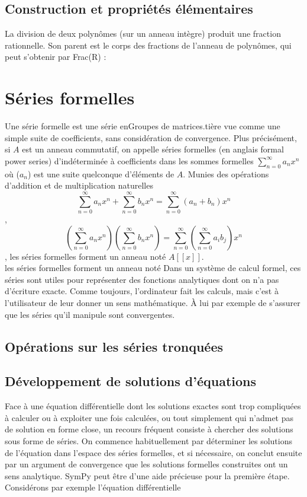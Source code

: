  \subsection{ Construction et propriétés élémentaires}
 La division de deux polynômes (sur un anneau intègre) produit une fraction rationnelle. Son parent est le corps des fractions de l’anneau de polynômes, qui peut s’obtenir par Frac(R) :
 \section{Séries formelles}
 Une série formelle est une série enGroupes de matrices.tière vue comme une simple suite de coefficients, sans considération de convergence. Plus précisément, si $A$ est un anneau commutatif, on appelle séries formelles (en anglais formal
 power series) d’indéterminée  à coefficients dans  les sommes formelles $\sum_{n=0}^{\infty} a_{n}x^{n}$ où ($a_{n}$) est une suite quelconque d’éléments de $A$. Munies des opérations d’addition et de multiplication naturelles
\[
 \sum_{n=0}^{\infty} a_{n}x^{n} + \sum_{n=0}^{\infty} b_{n}x^{n} = \sum_{n=0}^{\infty} \left(a_{n}+b_{n}\right) x^{n} 
 \],
\[
 \left(\sum_{n=0}^{\infty} a_{n}x^{n}\right) \left(\sum_{n=0}^{\infty} b_{n}x^{n}\right) =  \sum_{n=0}^{\infty} \left( \sum_{n=0}^{\infty} a_{i}b_{j}\right)x^{n}
\], les séries formelles forment un anneau noté $A\left[ \left[ x\right] \right] $.\\

les séries formelles forment un anneau noté Dans un système de calcul formel, ces séries sont utiles pour représenter des fonctions analytiques dont on n'a pas d’écriture exacte. Comme toujours, l’ordinateur fait les calculs, mais c’est à l'utilisateur de leur donner un sens mathématique. À lui par exemple de s’assurer que les séries qu’il manipule sont convergentes. 
 \subsection{Opérations sur les séries tronquées}
 \subsection{Développement de solutions d’équations}
 Face à une équation différentielle dont les solutions exactes sont trop compliquées à calculer ou à exploiter une fois calculées, ou tout simplement qui n’admet pas de solution en forme close, un recours fréquent consiste à chercher des solutions sous forme de séries. On commence habituellement par déterminer les solutions 
de l’équation dans l’espace des séries formelles, et si nécessaire, on conclut ensuite par un argument de convergence que les solutions formelles construites ont un sens analytique. SymPy peut être d’une aide précieuse pour la première étape. Considérons par exemple l’équation différentielle

